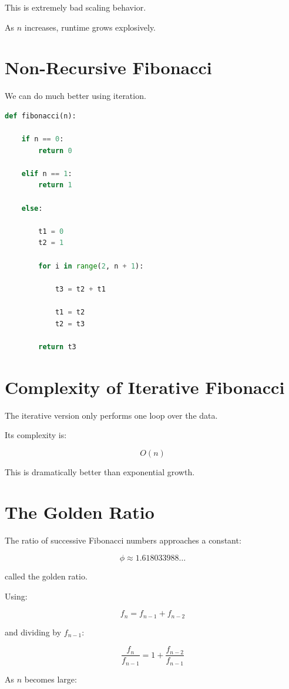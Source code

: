 \documentclass[11pt]{article}
\begin{document}
This is extremely bad scaling behavior.

As \(n\) increases, runtime grows explosively.

\section{Non-Recursive Fibonacci}

We can do much better using iteration.

\begin{lstlisting}[language=Python]
def fibonacci(n):

    if n == 0:
        return 0

    elif n == 1:
        return 1

    else:

        t1 = 0
        t2 = 1

        for i in range(2, n + 1):

            t3 = t2 + t1

            t1 = t2
            t2 = t3

        return t3
\end{lstlisting}

\section{Complexity of Iterative Fibonacci}

The iterative version only performs one loop over the data.

Its complexity is:

\[
O(n)
\]

This is dramatically better than exponential growth.

\section{The Golden Ratio}

The ratio of successive Fibonacci numbers approaches a constant:

\[
\phi \approx 1.618033988\ldots
\]

called the golden ratio.

Using:

\[
f_n = f_{n-1} + f_{n-2}
\]

and dividing by \(f_{n-1}\):

\[
\frac{f_n}{f_{n-1}}
=
1
+
\frac{f_{n-2}}{f_{n-1}}
\]

As \(n\) becomes large:
\end{document}
